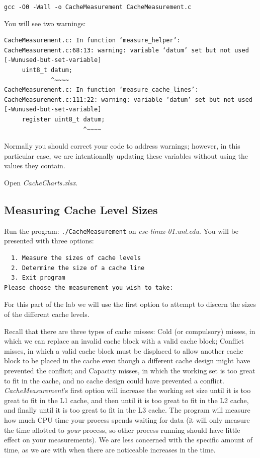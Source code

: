 \texttt{gcc -O0 -Wall -o CacheMeasurement CacheMeasurement.c}

You will see two warnings:
\begin{verbatim}
CacheMeasurement.c: In function ‘measure_helper’:
CacheMeasurement.c:68:13: warning: variable ‘datum’ set but not used [-Wunused-but-set-variable]
     uint8_t datum;
             ^~~~~
CacheMeasurement.c: In function ‘measure_cache_lines’:
CacheMeasurement.c:111:22: warning: variable ‘datum’ set but not used [-Wunused-but-set-variable]
     register uint8_t datum;
                      ^~~~~
\end{verbatim}

Normally you should correct your code to address warnings; however, in this
particular case, we are intentionally updating these variables without using
the values they contain.

Open \textit{CacheCharts.xlsx}.

\subsection{Measuring Cache Level Sizes}

Run the program: \texttt{./CacheMeasurement} on \textit{cse-linux-01.unl.edu}. You will
be presented with three options:

\begin{verbatim}
  1. Measure the sizes of cache levels
  2. Determine the size of a cache line
  3. Exit program
Please choose the measurement you wish to take:
\end{verbatim}

For this part of the lab we will use the first option to attempt to discern the
sizes of the different cache levels.

Recall that there are three types of cache misses: Cold (or compulsory) misses,
in which we can replace an invalid cache block with a valid cache block;
Conflict misses, in which a valid cache block must be displaced to allow
another cache block to be placed in the cache even though a different cache
design might have prevented the conflict; and Capacity misses, in which the
working set is too great to fit in the cache, and no cache design could have
prevented a conflict. \textit{CacheMeasurement}'s first option will increase the
working set size until it is too great to fit in the L1 cache, and then until it
is too great to fit in the L2 cache, and finally until it is too great to fit in
the L3 cache. The program will measure how much CPU time your process spends
waiting for data (it will only measure the time allotted to \textit{your}
process, so other process running should have little effect on your
measurements). We are less concerned with the specific amount of time, as we are
with when there are noticeable increases in the time.

